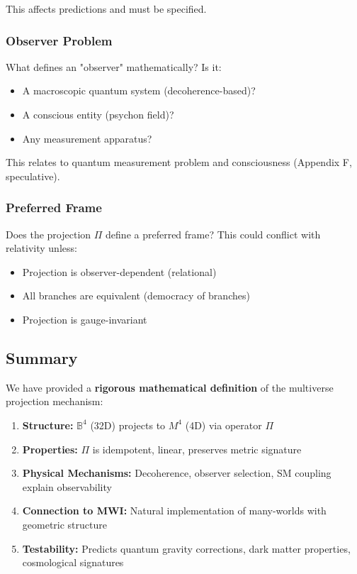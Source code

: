 This affects predictions and must be specified.

\subsubsection{Observer Problem}

What defines an "observer" mathematically? Is it:
\begin{itemize}
\item A macroscopic quantum system (decoherence-based)?
\item A conscious entity (psychon field)?
\item Any measurement apparatus?
\end{itemize}

This relates to quantum measurement problem and consciousness (Appendix F, speculative).

\subsubsection{Preferred Frame}

Does the projection $\Pi$ define a preferred frame? This could conflict with relativity unless:
\begin{itemize}
\item Projection is observer-dependent (relational)
\item All branches are equivalent (democracy of branches)
\item Projection is gauge-invariant
\end{itemize}

\subsection{Summary}

We have provided a \textbf{rigorous mathematical definition} of the multiverse projection mechanism:

\begin{enumerate}
\item \textbf{Structure:} $\mathbb{B}^4$ (32D) projects to $M^4$ (4D) via operator $\Pi$
\item \textbf{Properties:} $\Pi$ is idempotent, linear, preserves metric signature
\item \textbf{Physical Mechanisms:} Decoherence, observer selection, SM coupling explain observability
\item \textbf{Connection to MWI:} Natural implementation of many-worlds with geometric structure
\item \textbf{Testability:} Predicts quantum gravity corrections, dark matter properties, cosmological signatures
\end{enumerate}

